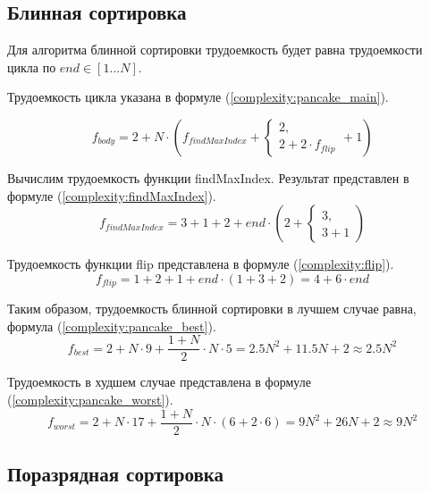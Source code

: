 \subsection{Блинная сортировка}

Для алгоритма блинной сортировки трудоемкость будет равна трудоемкости цикла по $end \in [1 \ldots N]$.

Трудоемкость цикла указана в формуле (\ref{complexity:pancake_main}).

\begin{equation}
	\label{complexity:pancake_main}
	f_{body} = 2 + N \cdot (f_{findMaxIndex} + %
	\begin{cases}
		2, \\
		2 + 2 \cdot f_{flip} 
	\end{cases}
	+ 1
	)
\end{equation}

Вычислим трудоемкость функции findMaxIndex. Результат представлен в формуле (\ref{complexity:findMaxIndex}).
\begin{equation}
	\label{complexity:findMaxIndex}
	f_{findMaxIndex} = 3 + 1 + 2 + end \cdot (2 +
		\begin{cases}
			3, \\
			3 + 1
		\end{cases}
	)
\end{equation}

Трудоемкость функции flip представлена в формуле (\ref{complexity:flip}).
\begin{equation}
	\label{complexity:flip}
	f_{flip} = 1 + 2 + 1 + end \cdot (1 + 3 + 2) = 4 + 6 \cdot end
\end{equation}

Таким образом, трудоемкость блинной сортировки в лучшем случае равна, формула (\ref{complexity:pancake_best}).
\begin{equation}
	\label{complexity:pancake_best}
	f_{best} = 2 + N \cdot 9 + \frac{1 + N}{2} \cdot N \cdot 5 = 2.5N^2 + 11.5N + 2 \approx 2.5N^2
\end{equation}

Трудоемкость в худшем случае представлена в формуле (\ref{complexity:pancake_worst}).
\begin{equation}
	\label{complexity:pancake_worst}
	f_{worst} = 2 + N \cdot 17 + \frac{1 + N}{2} \cdot N \cdot (6 + 2 \cdot 6) = 9N^2 + 26N + 2 \approx 9N^2 
\end{equation}

\clearpage

\subsection{Поразрядная сортировка}

